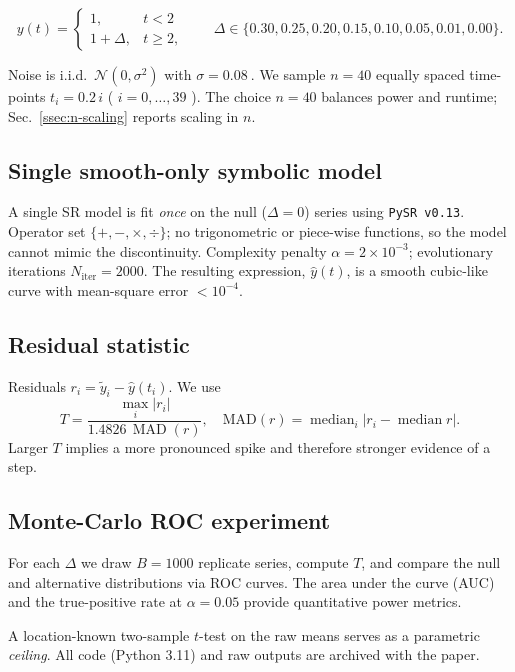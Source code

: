 \documentclass[11pt,a4paper]{article}
\begin{document}
\[
y(t)=\begin{cases}
      1,& t<2\\
      1+\Delta,& t\ge 2,
     \end{cases}
\qquad
\Delta\in\{0.30,0.25,0.20,0.15,0.10,0.05,0.01,0.00\}.
\]

Noise is i.i.d.\ \(\mathcal N(0,\sigma^{2})\) with
\(\sigma=\SI{0.08}{}\).  We sample \(n=40\) equally spaced time-points
\(t_i=0.2\,i\) ( \(i=0,\dots,39\) ).  The choice \(n=40\) balances power
and runtime; Sec.~\ref{ssec:n-scaling} reports scaling in \(n\).

\subsection{Single smooth-only symbolic model}
\label{ssec:model}

A single SR model is fit \emph{once} on the null (\(\Delta=0\)) series
using \texttt{PySR v0.13}.  Operator set
\(\{+,-,\times,\div\}\); no trigonometric or piece-wise functions, so the
model cannot mimic the discontinuity.  Complexity penalty
\(\alpha=2\times10^{-3}\); evolutionary iterations
\(N_{\mathrm{iter}}=2000\).  The resulting expression,
\(\hat y(t)\), is a smooth cubic-like curve with mean-square error
\(<10^{-4}\).

\subsection{Residual statistic}

Residuals \(r_i=\tilde y_i-\hat y(t_i)\).
We use
\begin{equation}\label{eq:T}
  T = \frac{\max_i |r_i|}{1.4826\,
        \operatorname{MAD}(r)},\quad
  \text{MAD}(r)=\operatorname{median}_i|r_i-\operatorname{median}r|.
\end{equation}
Larger \(T\) implies a more pronounced spike and therefore stronger
evidence of a step.

\subsection{Monte-Carlo ROC experiment}

For each \(\Delta\) we draw \(B=1000\) replicate series, compute \(T\),
and compare the null and alternative distributions via ROC curves.  The
area under the curve (AUC) and the true-positive rate at
\(\alpha=0.05\) provide quantitative power metrics.

A location-known two-sample \(t\)-test on the raw means serves as a
parametric \emph{ceiling}.  All code (Python 3.11) and raw outputs are
archived with the paper.
\end{document}
